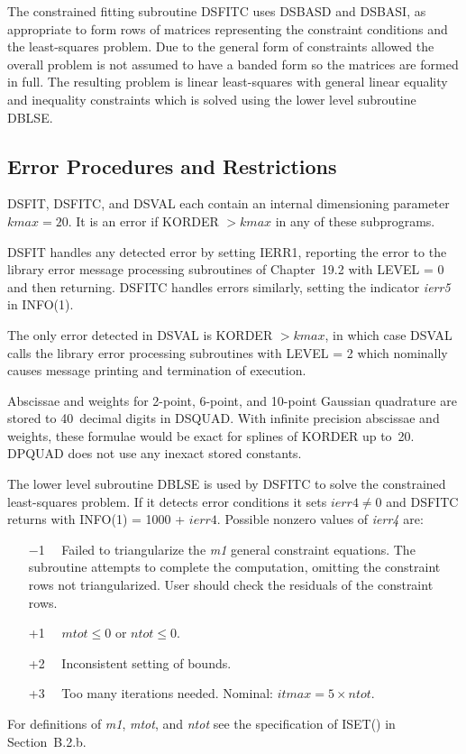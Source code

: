 \documentclass[twoside]{MATH77}
\begin{document}
The constrained fitting subroutine DSFITC uses DSBASD and DSBASI, as
appropriate to form rows of matrices representing the constraint conditions
and the least-squares problem. Due to the general form of constraints
allowed the overall problem is not assumed to have a banded form so the
matrices are formed in full. The resulting problem is linear least-squares
with general linear equality and inequality constraints which is solved
using the lower level subroutine DBLSE.




\subsection{Error Procedures and Restrictions}

DSFIT, DSFITC, and DSVAL each contain an internal dimensioning parameter $%
kmax = 20.$ It is an error if KORDER $> kmax$ in any of these subprograms.

DSFIT handles any detected error by setting IERR1, reporting the error to
the library error message processing subroutines of Chapter~19.2 with
LEVEL = 0 and then returning. DSFITC handles errors similarly, setting the
indicator {\em ierr5} in INFO(1).

The only error detected in DSVAL is KORDER $> kmax$, in which case DSVAL
calls the library error processing subroutines with LEVEL = 2 which
nominally causes message printing and termination of execution.

Abscissae and weights for 2-point, 6-point, and 10-point Gaussian quadrature
are stored to 40~decimal digits in DSQUAD. With infinite precision abscissae
and weights, these formulae would be exact for splines of KORDER up to~20.
DPQUAD does not use any inexact stored constants.

The lower level subroutine DBLSE is used by DSFITC to solve the
constrained least-squares problem.  If it detects error conditions it
sets $ierr4 \neq 0$ and DSFITC returns with INFO(1) = 1000 + $ierr4.$
Possible nonzero values of {\em ierr4} are:
\begin{itemize}
\item[$-$1]\ \ Failed to triangularize the {\em m1} general constraint
equations.  The subroutine attempts to complete the computation,
omitting the constraint rows not triangularized.  User should check
the residuals of the constraint rows.
\item[+1]\ \ $mtot \leq 0$ or $ntot \leq 0$.
\item[+2]\ \ Inconsistent setting of bounds.
\item[+3]\ \ Too many iterations needed.  Nominal: $itmax = 5 \times ntot.$
\end{itemize}
For definitions of {\em m1}, {\em mtot}, and {\em ntot} see the specification of
ISET() in Section~B.2.b.
\end{document}
